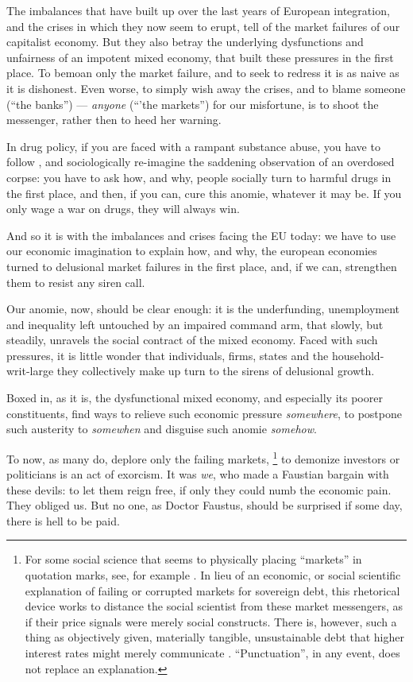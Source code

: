 The imbalances that have built up over the last years of European integration, and the crises in which they now seem to erupt, tell of the market failures of our capitalist economy.
But they also betray the underlying dysfunctions and unfairness of an impotent mixed economy, that built these pressures in the first place.
To bemoan only the market failure, and to seek to redress it is as naive as it is dishonest.
Even worse, to simply wish away the crises, and to blame someone (``the banks'') --- \emph{anyone} (``'the markets'') for our misfortune, is to shoot the messenger, rather then to heed her warning.

In drug policy, if you are faced with a rampant substance abuse, you have to follow \cite{Mills-1959-aa}, and sociologically re-imagine the saddening observation of an overdosed corpse:
you have to ask how, and why, people socially turn to harmful drugs in the first place, and then, if you can, cure this anomie, whatever it may be.
If you only wage a war on drugs, they will always win.

And so it is with the imbalances and crises facing the \gls{EU} today:
we have to use our economic imagination to explain how, and why, the european economies turned to delusional market failures in the first place, and, if we can, strengthen them to resist any siren call.

Our anomie, now, should be clear enough:
it is the underfunding, unemployment and inequality left untouched by an impaired command arm, that slowly, but steadily, unravels the social contract of the mixed economy.
Faced with such pressures, it is little wonder that individuals, firms, states and the household-writ-large they collectively make up turn to the sirens of delusional growth.

Boxed in, as it is, the dysfunctional mixed economy, and especially its poorer constituents, find ways to relieve such economic pressure \emph{somewhere}, to postpone such austerity to \emph{somewhen} and disguise such anomie \emph{somehow}.

To now, as many do, deplore only the failing markets,
\footnote{
	For some social science that seems to physically placing ``markets'' in quotation marks, see, for example \citealt{Beckert2012}.
	In lieu of an economic, or social scientific explanation of failing or corrupted markets for sovereign debt, this rhetorical device works to distance the social scientist from these market messengers, as if their price signals were merely social constructs.
	There is, however, such a thing as objectively given, materially tangible, unsustainable debt that higher interest rates might merely communicate \citep[55]{Wihlborg2010}.
	``Punctuation'', in any event, does not replace an explanation.
}
to demonize investors or politicians is an act of exorcism.
It was \emph{we}, who made a Faustian bargain with these devils:
to let them reign free, if only they could numb the economic pain.
They obliged us.
But no one, as Doctor Faustus, should be surprised if some day, there is hell to be paid.

